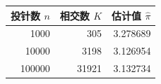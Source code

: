 \begin{tabular}{rrr}
\toprule
投针数 $n$ & 相交数 $K$ & 估计值 $\widehat{\pi}$ \\
\midrule
1000 & 305 & 3.278689 \\
10000 & 3198 & 3.126954 \\
100000 & 31921 & 3.132734 \\
\bottomrule
\end{tabular}
